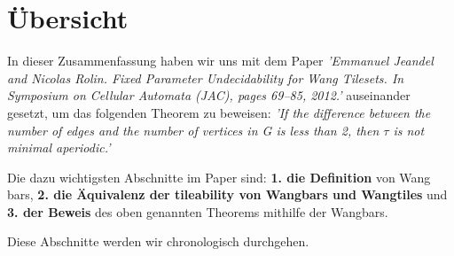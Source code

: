 

\newcommand{\dozent}{Günther Rothe}
\newcommand{\ubungNo}{05}
\newcommand{\veranstaltung}{Proseminar: Theoretische Informatik}
\newcommand{\semester}{W21/22}
\newcommand{\studenten}{Thore Brehmer}
\setcounter{section}{-1} 




\section{Übersicht}

In dieser Zusammenfassung haben wir uns mit dem Paper {\itshape'Emmanuel Jeandel and Nicolas Rolin. Fixed Parameter Undecidability for Wang Tilesets. In Symposium on Cellular Automata (JAC), pages 69–85, 2012.'} auseinander gesetzt, um das folgenden Theorem zu beweisen: {\itshape'If the difference between the number of edges and the number of vertices in G is less than 2, then $\tau$ is not minimal aperiodic.'}

Die dazu wichtigsten Abschnitte im Paper sind: \textbf{1. die Definition} von Wang bars, \textbf{2. die Äquivalenz der tileability von Wangbars und Wangtiles} und \textbf{3. der Beweis} des oben genannten Theorems mithilfe der Wangbars.

Diese Abschnitte werden wir chronologisch durchgehen.


